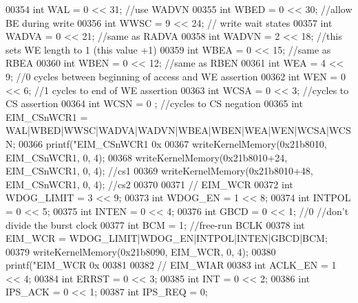 \begin{DoxyCode}
{{{{{{{{00354     \textcolor{keywordtype}{int} WAL = 0 << 31; \textcolor{comment}{//use WADVN}
00355     \textcolor{keywordtype}{int} WBED = 0 << 30; \textcolor{comment}{//allow BE during write}
00356     \textcolor{keywordtype}{int} WWSC = 9 << 24; \textcolor{comment}{// write wait states}
00357     \textcolor{keywordtype}{int} WADVA = 0 << 21; \textcolor{comment}{//same as RADVA}
00358     \textcolor{keywordtype}{int} WADVN = 2 << 18; \textcolor{comment}{//this sets WE length to 1 (this value +1)}
00359     \textcolor{keywordtype}{int} WBEA = 0 << 15; \textcolor{comment}{//same as RBEA}
00360     \textcolor{keywordtype}{int} WBEN = 0 << 12; \textcolor{comment}{//same as RBEN}
00361     \textcolor{keywordtype}{int} WEA = 4 << 9; \textcolor{comment}{//0 cycles between beginning of access and WE assertion}
00362     \textcolor{keywordtype}{int} WEN = 0 << 6; \textcolor{comment}{//1 cycles to end of WE assertion}
00363     \textcolor{keywordtype}{int} WCSA = 0 << 3; \textcolor{comment}{//cycles to CS assertion}
00364     \textcolor{keywordtype}{int} WCSN = 0 ; \textcolor{comment}{//cycles to CS negation}
00365     \textcolor{keywordtype}{int} EIM\_CSnWCR1 = WAL|WBED|WWSC|WADVA|WADVN|WBEA|WBEN|WEA|WEN|WCSA|WCSN;
00366     printf(\textcolor{stringliteral}{"EIM\_CSnWCR1 0x%
00367     writeKernelMemory(0x21b8010, EIM\_CSnWCR1, 0, 4);
00368     writeKernelMemory(0x21b8010+24, EIM\_CSnWCR1, 0, 4); \textcolor{comment}{//cs1}
00369     writeKernelMemory(0x21b8010+48, EIM\_CSnWCR1, 0, 4); \textcolor{comment}{//cs2}
00370 
00371     \textcolor{comment}{// EIM\_WCR}
00372     \textcolor{keywordtype}{int} WDOG\_LIMIT = 3 << 9;
00373     \textcolor{keywordtype}{int} WDOG\_EN = 1 << 8;
00374     \textcolor{keywordtype}{int} INTPOL = 0 << 5;
00375     \textcolor{keywordtype}{int} INTEN = 0 << 4;
00376     \textcolor{keywordtype}{int} GBCD = 0 << 1; \textcolor{comment}{//0 //don't divide the burst clock}
00377     \textcolor{keywordtype}{int} BCM = 1; \textcolor{comment}{//free-run BCLK}
00378     \textcolor{keywordtype}{int} EIM\_WCR = WDOG\_LIMIT|WDOG\_EN|INTPOL|INTEN|GBCD|BCM;
00379     writeKernelMemory(0x21b8090, EIM\_WCR, 0, 4);
00380     printf(\textcolor{stringliteral}{"EIM\_WCR 0x%
00381 
00382     \textcolor{comment}{// EIM\_WIAR}
00383     \textcolor{keywordtype}{int} ACLK\_EN = 1 << 4;
00384     \textcolor{keywordtype}{int} ERRST = 0 << 3;
00385     \textcolor{keywordtype}{int} INT = 0 << 2;
00386     \textcolor{keywordtype}{int} IPS\_ACK = 0 << 1;
00387     \textcolor{keywordtype}{int} IPS\_REQ = 0;
}}}}}}}}}}
\end{DoxyCode}
